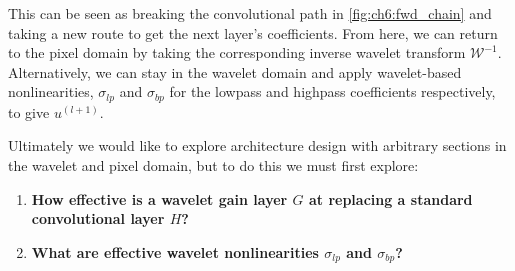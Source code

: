 This can be seen as breaking the convolutional path in
\autoref{fig:ch6:fwd_chain} and taking a new route to get the next layer's
coefficients. From here, we can return to the pixel domain by taking the
corresponding inverse wavelet transform $\mathcal{W}^{-1}$. Alternatively, we
can stay in the wavelet domain and apply wavelet-based nonlinearities,
$\sigma_{lp}$ and $\sigma_{bp}$ for the lowpass and highpass coefficients
respectively, to give $u^{(l+1)}$. 

Ultimately we would like to explore architecture design with arbitrary sections
in the wavelet and pixel domain, but to do this we must first explore: 

\begin{enumerate}
  \item \textbf{How effective is a wavelet gain layer $G$ at replacing a
    standard convolutional layer $H$?}
  \item \textbf{What are effective wavelet nonlinearities $\sigma_{lp}$ and $\sigma_{bp}$?}
\end{enumerate}
